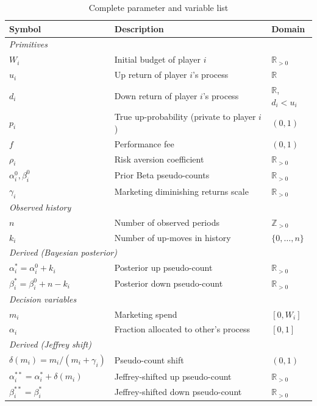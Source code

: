 \documentclass[12pt,a4paper]{article}
\newcommand{\R}{\mathbb{R}}
\newcommand{\1}{\mathbf{1}}
\begin{document}
\begin{table}[H]
  \centering
  \caption{Complete parameter and variable list}
  \label{tab:params}
  \begin{tabular}{@{} l l l @{}}
    \toprule
    Symbol & Description & Domain \\
    \midrule
    \multicolumn{3}{l}{\textit{Primitives}} \\
    $W_i$ & Initial budget of player $i$ & $\R_{>0}$ \\
    $u_i$ & Up return of player $i$'s process & $\R$ \\
    $d_i$ & Down return of player $i$'s process & $\R$, $d_i < u_i$ \\
    $p_i$ & True up-probability (private to player $i$) & $(0,1)$ \\
    $f$ & Performance fee & $(0,1)$ \\
    $\rho_i$ & Risk aversion coefficient & $\R_{>0}$ \\
    $\alpha_i^0, \beta_i^0$ & Prior Beta pseudo-counts & $\R_{>0}$ \\
    $\gamma_i$ & Marketing diminishing returns scale & $\R_{>0}$ \\
    \midrule
    \multicolumn{3}{l}{\textit{Observed history}} \\
    $n$ & Number of observed periods & $\mathbb{Z}_{>0}$ \\
    $k_i$ & Number of up-moves in history & $\{0,\ldots,n\}$ \\
    \midrule
    \multicolumn{3}{l}{\textit{Derived (Bayesian posterior)}} \\
    $\alpha_i^* = \alpha_i^0 + k_i$ & Posterior up pseudo-count & $\R_{>0}$ \\
    $\beta_i^* = \beta_i^0 + n - k_i$ & Posterior down pseudo-count & $\R_{>0}$ \\
    \midrule
    \multicolumn{3}{l}{\textit{Decision variables}} \\
    $m_i$ & Marketing spend & $[0, W_i]$ \\
    $\alpha_i$ & Fraction allocated to other's process & $[0,1]$ \\
    \midrule
    \multicolumn{3}{l}{\textit{Derived (Jeffrey shift)}} \\
    $\delta(m_i) = m_i/(m_i+\gamma_i)$ & Pseudo-count shift & $(0,1)$ \\
    $\alpha_i^{**} = \alpha_i^* + \delta(m_i)$ & Jeffrey-shifted up pseudo-count & $\R_{>0}$ \\
    $\beta_i^{**} = \beta_i^*$ & Jeffrey-shifted down pseudo-count & $\R_{>0}$ \\

\end{tabular}
\end{table}
\end{document}
